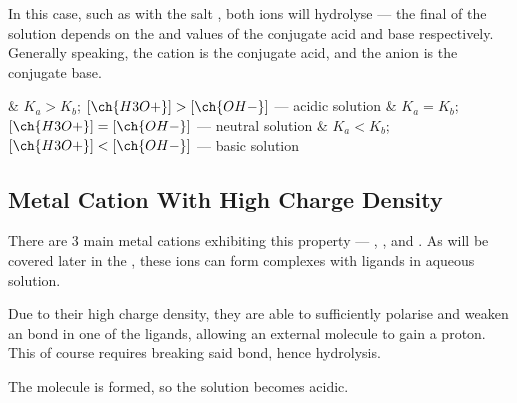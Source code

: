 			In this case, such as with the salt , both ions will hydrolyse --- the final \pH{} of the solution depends on
			the \Ka{} and \Kb{} values of the conjugate acid and base respectively. Generally speaking, the cation is the conjugate acid,
			and the anion is the conjugate base.

			\begin{bulletlist}
				& $K_{a} > K_{b}$;\hspace{4mm} $[\ch{H3O+}] > [\ch{OH-}]$ \hspace{3mm} --- \hspace{3mm} acidic solution
				& $K_{a} = K_{b}$;\hspace{4mm} $[\ch{H3O+}] = [\ch{OH-}]$ \hspace{3mm} --- \hspace{3mm} neutral solution
				& $K_{a} < K_{b}$;\hspace{4mm} $[\ch{H3O+}] < [\ch{OH-}]$ \hspace{3mm} --- \hspace{3mm} basic solution
			\end{bulletlist}



		\subsection{Metal Cation With High Charge Density}

			There are 3 main metal cations exhibiting this property --- , , and . As will be covered later
			in the , these ions can form complexes with  ligands in aqueous solution.

			Due to their high charge density, they are able to sufficiently polarise and weaken an  bond in one of the ligands,
			allowing an external  molecule to gain a proton. This of course requires breaking said  bond, hence hydrolysis.

			The  molecule is formed, so the solution becomes acidic.




